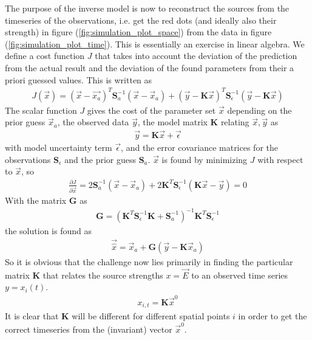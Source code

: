 \documentclass[]{article}
\begin{document}
The purpose of the inverse model is now to reconstruct the sources from the timeseries of the observations, i.e. get the red dots (and ideally also their strength) in figure (\ref{fig:simulation_plot_space}) from the data in figure (\ref{fig:simulation_plot_time}). This is essentially an exercise in linear algebra. We define a cost function $J$ that takes into account the deviation of the prediction from the actual result and the deviation of the found parameters from their a priori guessed values. This is written as 
\begin{align}
J(\vec{x}) = (\vec{x} - \vec{x_a})^T \mathbf{S}_a^{-1} (\vec{x} - \vec{x}_a) + (\vec{y} - \mathbf{K}\vec{x})^T \mathbf{S}_\epsilon^{-1} (\vec{y} - \mathbf{K} \vec{x})
\end{align}
The scalar function $J$ gives the cost of the parameter set $\vec{x}$ depending on the prior guess $\vec{x}_a$, the observed data $\vec{y}$, the model matrix $\mathbf{K}$ relating $\vec{x},\vec{y}$ as
\begin{align}
\vec{y} = \mathbf{K} \vec{x} + \vec{\epsilon}
\label{eq:model K}
\end{align}
with model uncertainty term $\vec{\epsilon}$, and the error covariance matrices for the observations $\mathbf{S}_\epsilon$ and the prior guess $\mathbf{S}_a$. $\vec{x}$ is found by minimizing $J$ with respect to $\vec{x}$, so
\begin{align}
\frac{\partial J}{\partial \vec{x}} = 2 \mathbf{S}_a^{-1} (\vec{x} - \vec{x}_a) + 2 \mathbf{K}^T \mathbf{S}_\epsilon^{-1} (\mathbf{K} \vec{x} - \vec{y}) = 0
\end{align}
With the matrix $\mathbf{G}$ as 
\begin{align}
\mathbf{G} = (\mathbf{K}^T \mathbf{S}_\epsilon^{-1}\mathbf{K} + \mathbf{S}_a^{-1})^{-1} \mathbf{K}^T \mathbf{S}_\epsilon^{-1}
\end{align}
the solution is found as
\begin{align}
\vec{\hat{x}} = \vec{x}_a + \mathbf{G}(\vec{y} - \mathbf{K} \vec{x}_a)
\end{align}
So it is obvious that the challenge now lies primarily in finding the particular matrix $\mathbf{K}$ that relates the source strengths $x = \vec{E}$ to an observed time series $y = x_{i}(t)$.
\begin{align}
x_{i,t} = \mathbf{K} \vec{x}^0
\end{align}
It is clear that $\mathbf{K}$ will be different for different spatial points $i$ in order to get the correct timeseries from the (invariant) vector $\vec{x}^0$.
\end{document}
